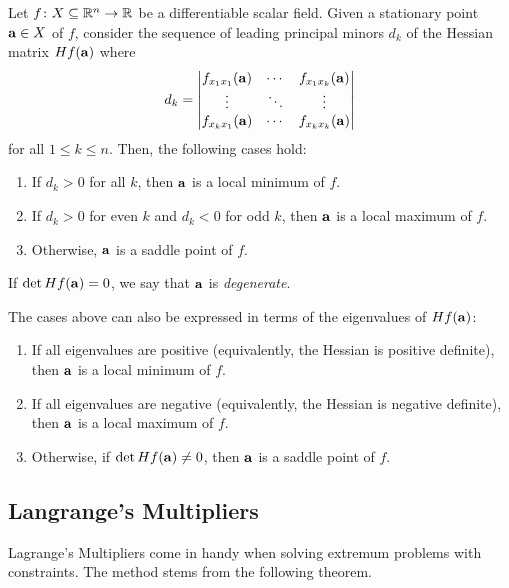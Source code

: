 \documentclass{article}
\begin{document}
\begin{theorem}
  Let $f \colon X \subseteq \mathbb{R}^n \to \mathbb{R}$ be a differentiable scalar field.
  Given a stationary point $\mathbf{a} \in X$ of $f$, consider the sequence of leading principal minors $d_k$ of the Hessian matrix $Hf(\mathbf{a})$ where
  \begin{align}
    d_k = \begin{vmatrix} f_{x_1 x_1}(\mathbf{a}) & \cdots & f_{x_1 x_k}(\mathbf{a})
                \\
                \vdots                & \ddots & \vdots
                \\
                f_{x_k x_1}(\mathbf{a}) & \cdots & f_{x_k x_k}(\mathbf{a})
          \end{vmatrix}
  \end{align}
  for all $1 \leq k \leq n$.
  Then, the following cases hold:
  \begin{enumerate}
    \item If $d_k > 0$ for all $k$, then $\mathbf{a}$ is a local minimum of $f$.
    \item If $d_k > 0$ for even $k$ and $d_k < 0$ for odd $k$, then $\mathbf{a}$ is a local maximum of $f$.
    \item Otherwise, $\mathbf{a}$ is a saddle point of $f$.
  \end{enumerate}
  If $\det Hf(\mathbf{a}) = 0$, we say that $\mathbf{a}$ is \emph{degenerate}.
\end{theorem}
The cases above can also be expressed in terms of the eigenvalues of $Hf(\mathbf{a})$:
\begin{enumerate}
  \item If all eigenvalues are positive (equivalently, the Hessian is positive definite), then $\mathbf{a}$ is a local minimum of $f$.
  \item If all eigenvalues are negative (equivalently, the Hessian is negative definite), then $\mathbf{a}$ is a local maximum of $f$.
  \item Otherwise, if $\det Hf(\mathbf{a}) \neq 0$, then $\mathbf{a}$ is a saddle point of $f$.
\end{enumerate}

\subsection{Langrange's Multipliers}

Lagrange's Multipliers come in handy when solving extremum problems with constraints.
The method stems from the following theorem.
\end{document}
